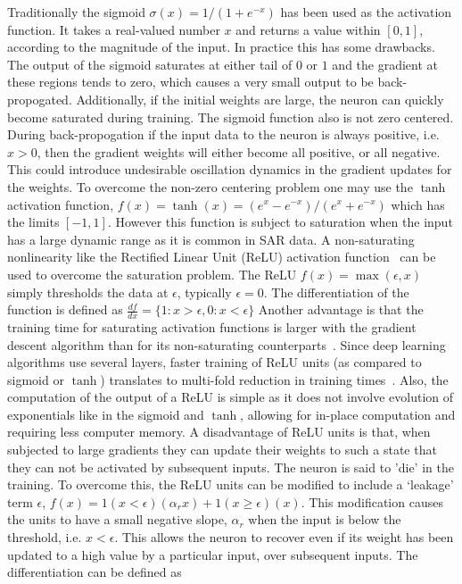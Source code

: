 Traditionally the sigmoid $\sigma(x) =  1 / (1+e^{-x})$  has been used as the activation function. It takes a real-valued number $x$ and returns a value within $[0,1]$, according to the magnitude of the input. In practice this has some drawbacks. The output of the sigmoid saturates at either tail of $0$ or $1$ and the gradient at these regions tends to zero, which causes a very small output to be back-propogated. Additionally, if the initial weights are large, the neuron can quickly become saturated during training. The sigmoid function also is not zero centered. During back-propogation if the input data to the neuron is always positive, i.e. $x>0$, then the gradient weights will either become all positive, or all negative. This could introduce undesirable oscillation dynamics in the gradient updates for the weights. To overcome the non-zero centering problem one may use the $\tanh$ activation function, $ f(x) = \tanh(x) = (e^x - e^{-x}) / (e^x + e^{-x})$ which has the limits $[-1,1]$. However this function is subject to saturation when the input has a large dynamic range as it is common in SAR data. 
A non-saturating nonlinearity like the Rectified Linear Unit (ReLU) activation function~\cite{glorot2011deep} can be used to overcome the saturation problem. The ReLU $f(x) = \max(\epsilon,x)$ simply thresholds the data at $\epsilon$, typically $\epsilon=0$. The differentiation of the function is defined as $ \frac{df}{dx} = \{1 : x > \epsilon, 0 : x < \epsilon\}$
Another advantage is that the training time for saturating activation functions is larger with the gradient descent algorithm than for its non-saturating counterparts~\cite{krizhevsky2012imagenet}. Since deep learning algorithms use several layers, faster training of ReLU units (as compared to sigmoid or $\tanh$) translates to multi-fold reduction in training times~\cite{nair2010rectified}. Also, the computation of the output of a ReLU is  simple as it does not involve evolution of exponentials like in the sigmoid and $\tanh$, allowing for in-place computation and requiring less computer memory. 
A disadvantage of ReLU units is that, when subjected to large gradients they can update their weights to such a state that they can not be activated by subsequent inputs. The neuron is said to 'die' in the training. To overcome this, the ReLU units can be modified to include a `leakage' term $\epsilon$, $f(x) = 1(x<\epsilon)(\alpha_r x) + 1(x \ge \epsilon)(x)$. This modification causes the units to have a small negative slope, $\alpha_r$ when the input is below the threshold, i.e. $x<\epsilon$. This allows the neuron to recover even if its weight has been updated to a high value by a particular input, over subsequent inputs. The differentiation can be defined as


